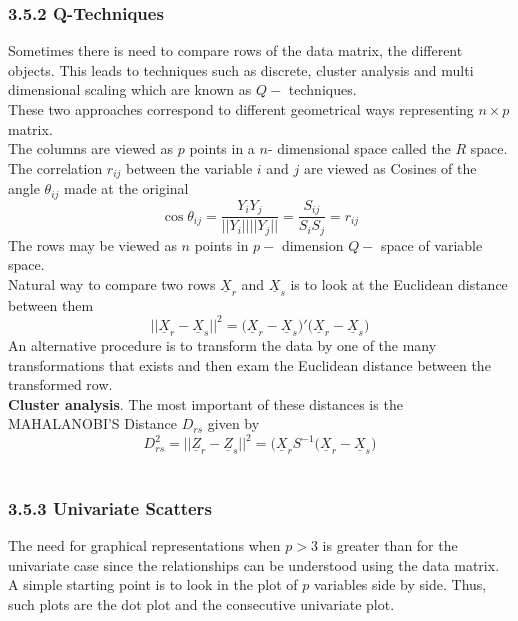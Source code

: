 \documentclass[11pt,a4paper]{article}
\theoremstyle{definition}
\begin{document}
\subsubsection*{3.5.2 Q-Techniques}
Sometimes there is need to compare rows of the data matrix, the different objects. This leads to techniques such as discrete, cluster analysis and multi dimensional scaling which are known as $Q-$ techniques.\\
These two approaches correspond to different geometrical ways representing $n\times p$ matrix.\\
The columns are viewed as $p$ points in a $n$- dimensional space called the $R$ space. The correlation $r_{ij}$ between the variable $i$ and $j$ are viewed as Cosines of the angle $\theta_{ij}$ made at the original $$\cos \theta_{ij}=\frac{Y_iY_j}{||Y_i||||Y_j||}=\frac{S_{ij}}{S_iS_j}=r_{ij}$$ The rows may be viewed as $n$ points in $p-$ dimension $Q-$ space of variable space.\\
Natural way to compare two rows $\underline{X}_r$ and $\underline{X}_s$ is to look at the Euclidean distance between them $$||\underline{X}_r-\underline{X}_s||^2=\big(\underline{X}_r-\underline{X}_s\big)'\big(\underline{X}_r-\underline{X}_s\big)$$
An alternative procedure is to transform the data by one of the many transformations that exists and then exam the Euclidean distance between the transformed row.\\

\textbf{Cluster analysis}. The most important of these distances is the MAHALANOBI'S Distance $D_{rs}$ given by $$D^2_{rs}=||\underline{Z}_r-\underline{Z}_s||^2=\big(\underline{X}_rS^{-1}\big(\underline{X}_r-\underline{X}_s\big)$$\\





\subsubsection*{3.5.3 Univariate Scatters}
The need for graphical representations when $p>3$ is greater than for the univariate case since the relationships can be understood using the data matrix.\\
A simple starting point is to look in the plot of $p$ variables side by side. Thus, such plots are the dot plot and the consecutive univariate plot.
\end{document}
